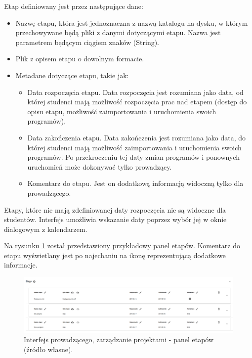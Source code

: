 Etap definiowany jest przez następujące dane:
\begin {itemize}
    \item Nazwę etapu, która jest jednoznaczna z nazwą katalogu na dysku, w którym przechowywane będą pliki z danymi dotyczącymi etapu.
    Nazwa jest parametrem będącym ciągiem znaków (String).
    \item Plik z opisem etapu o dowolnym formacie.
    \item Metadane dotyczące etapu, takie jak:
    \begin {itemize}
        \item Data rozpoczęcia etapu.
        Data rozpoczęcia jest rozumiana jako data, od której studenci mają możliwość rozpoczęcia prac nad etapem (dostęp do opisu etapu, możliwość zaimportowania i uruchomienia swoich programów),
        \item Data zakończenia etapu.
        Data zakończenia jest rozumiana jako data, do której studenci mają możliwość zaimportowania i uruchomienia swoich programów.
        Po przekroczeniu tej daty zmian programów i ponownych uruchomień może dokonywać tylko prowadzący.
        \item Komentarz do etapu.
        Jest on dodatkową informacją widoczną tylko dla prowadzącego.
    \end{itemize}
\end {itemize}

Etapy, które nie mają zdefiniowanej daty rozpoczęcia nie są widoczne dla studentów.
Interfejs umożliwia wskazanie daty poprzez wybór jej w oknie dialogowym z kalendarzem.

Na rysunku \ref{fig:lecturer_stages} został przedstawiony przykładowy panel etapów.
Komentarz do etapu wyświetlany jest po najechaniu na ikonę reprezentującą dodatkowe informacje.

\begin{figure}[h]
    \centering
    \includegraphics[width = 15cm]{chapter04/lecturer_stages.png}
    \caption{Interfejs prowadzącego, zarządzanie projektami - panel etapów (źródło własne).}
    \label{fig:lecturer_stages}
\end{figure}

